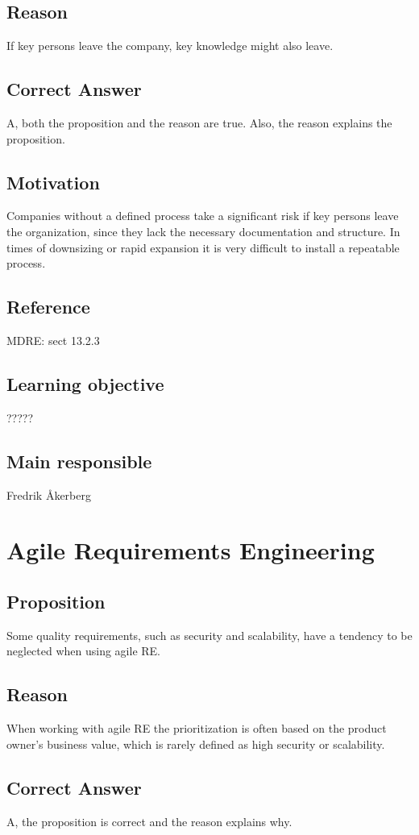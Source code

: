 \documentclass[a4paper]{article}
\begin{document}
\subsection*{Reason}
If key persons leave the company, key knowledge might also leave.
\subsection*{Correct Answer}
A, both the proposition and the reason are true. Also, the reason explains the proposition.
\subsection*{Motivation}
Companies without a defined process take a significant risk if key persons leave the organization, since they lack the necessary documentation and structure. In times of downsizing or rapid expansion it is very difficult to install a repeatable process.
\subsection*{Reference}
MDRE: sect 13.2.3
\subsection*{Learning objective}
?????
\subsection*{Main responsible}
 Fredrik Åkerberg
 


\section{Agile Requirements Engineering}
\subsection*{Proposition}
Some quality requirements, such as security and scalability, have a tendency to be neglected when using agile RE. 
\subsection*{Reason}
When working with agile RE the prioritization is often based on the product owner's business value, which is rarely defined as high security or scalability.
\subsection*{Correct Answer}
A, the proposition is correct and the reason explains why.
\end{document}
